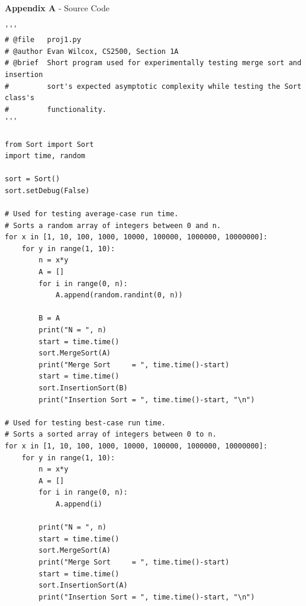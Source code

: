 \documentclass[a4paper]{article}
\begin{document}
    \newpage
    \textbf{Appendix A} - Source Code
    \begin{verbatim}
'''
# @file   proj1.py
# @author Evan Wilcox, CS2500, Section 1A
# @brief  Short program used for experimentally testing merge sort and insertion 
#         sort's expected asymptotic complexity while testing the Sort class's
#         functionality.
''' 

from Sort import Sort
import time, random

sort = Sort()
sort.setDebug(False)

# Used for testing average-case run time.
# Sorts a random array of integers between 0 and n.
for x in [1, 10, 100, 1000, 10000, 100000, 1000000, 10000000]:
    for y in range(1, 10):
        n = x*y
        A = []
        for i in range(0, n):
            A.append(random.randint(0, n))
        
        B = A
        print("N = ", n)
        start = time.time()
        sort.MergeSort(A)
        print("Merge Sort     = ", time.time()-start)
        start = time.time()
        sort.InsertionSort(B)
        print("Insertion Sort = ", time.time()-start, "\n")
        
# Used for testing best-case run time.
# Sorts a sorted array of integers between 0 to n.
for x in [1, 10, 100, 1000, 10000, 100000, 1000000, 10000000]:
    for y in range(1, 10):
        n = x*y
        A = []
        for i in range(0, n):
            A.append(i)
        
        print("N = ", n)
        start = time.time()
        sort.MergeSort(A)
        print("Merge Sort     = ", time.time()-start)
        start = time.time()
        sort.InsertionSort(A)
        print("Insertion Sort = ", time.time()-start, "\n")
    \end{verbatim}
\end{document}
